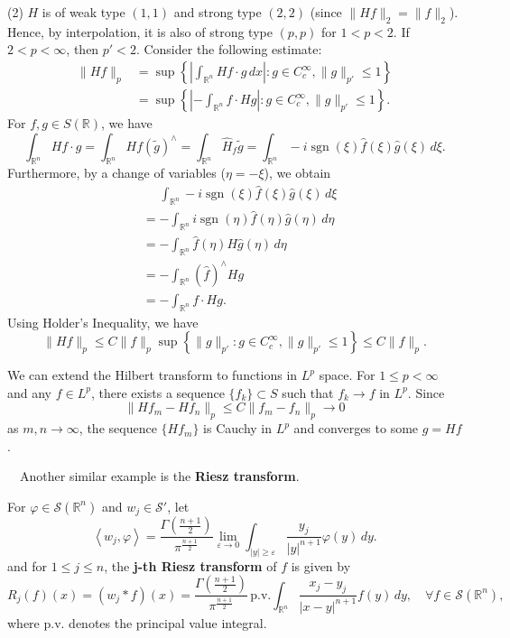 (2) $H$ is of weak type $(1,1)$ and strong type $(2,2)$ (since $\|Hf\|_2 = \|f\|_2$). Hence, by interpolation, it is also of strong type $(p,p)$ for $1 < p < 2$.  
If $2 < p < \infty$, then $p' < 2$. Consider the following estimate:  
\[  
\begin{aligned}  
\|Hf\|_p &= \sup \left\{ \left| \int_{\mathbb{R}^n} Hf \cdot g \, dx \right| : g \in C_c^{\infty}, \|g\|_{p'} \leq 1 \right\} \\  
&= \sup \left\{ \left| -\int_{\mathbb{R}^n} f \cdot Hg \right| : g \in C_c^{\infty}, \|g\|_{p'} \leq 1 \right\}.  
\end{aligned}  
\]  
For $f , g \in S(\mathbb{R})$, we have  
\[  
\int_{\mathbb{R}^n} Hf \cdot g = \int_{\mathbb{R}^n} Hf(\tilde{g})^{\wedge} = \int_{\mathbb{R}^n} \hat{H}_f \tilde{g} = \int_{\mathbb{R}^n} -i \operatorname{sgn}(\xi) \hat{f}(\xi) \hat{g}(\xi) \, d\xi.  
\]  
Furthermore, by a change of variables ($\eta = -\xi$), we obtain  
\[  
\begin{aligned}  
&\phantom{{}={}} \int_{\mathbb{R}^n} -i \operatorname{sgn}(\xi) \hat{f}(\xi) \hat{g}(\xi) \, d\xi \\  
&= -\int_{\mathbb{R}^n} i \operatorname{sgn}(\eta) \hat{f}(\eta) \hat{g}(\eta) \, d\eta \\  
&= -\int_{\mathbb{R}^n} \hat{f}(\eta) H\hat{g}(\eta) \, d\eta \\  
&= -\int_{\mathbb{R}^n} (\hat{f})^{\wedge} Hg \\  
&= -\int_{\mathbb{R}^n} f \cdot Hg.  
\end{aligned}  
\]  
Using Holder's Inequality, we have  
\[  
\|Hf\|_p \leqslant C\|f\|_p \sup \left\{ \|g\|_{p'} : g \in C_c^{\infty}, \|g\|_{p'} \leq 1 \right\} \leqslant C\|f\|_p.  
\]  
\begin{rmk}
    We can extend the Hilbert transform to functions in $L^p$ space. For $1 \leq p < \infty$ and any $f \in L^p$, there exists a sequence $\{f_k\} \subset S$ such that $f_k \rightarrow f$ in $L^p$. Since  
\[  
\|Hf_m - Hf_n\|_p \leq C\|f_m - f_n\|_p \rightarrow 0  
\]  
as $m, n \rightarrow \infty$, the sequence $\{Hf_m\}$ is Cauchy in $L^p$ and converges to some $g = Hf$.
\end{rmk}
~\
Another similar example is the \textbf{Riesz transform}.
\begin{definition}
    For $\varphi \in \mathcal{S}(\mathbb{R}^n)$ and $w_j \in \mathcal{S}'$, let
\[
\left\langle w_j, \varphi \right\rangle = \frac{\Gamma\left(\frac{n+1}{2}\right)}{\pi^{\frac{n+1}{2}}} \lim_{\varepsilon \rightarrow 0} \int_{|y| \geqslant \varepsilon} \frac{y_j}{|y|^{n+1}} \varphi(y) \, dy.
\]
and for $1 \leq j \leq n$, the \textbf{j-th Riesz transform} of $f$ is given by
\[
R_j(f)(x) = (w_j * f)(x) = \frac{\Gamma\left(\frac{n+1}{2}\right)}{\pi^{\frac{n+1}{2}}} \, \text{p.v.} \int_{\mathbb{R}^n} \frac{x_j-y_j}{|x-y|^{n+1}} f(y) \, dy, \quad \forall f \in \mathcal{S}(\mathbb{R}^n),
\]
where p.v. denotes the principal value integral.
\end{definition}

